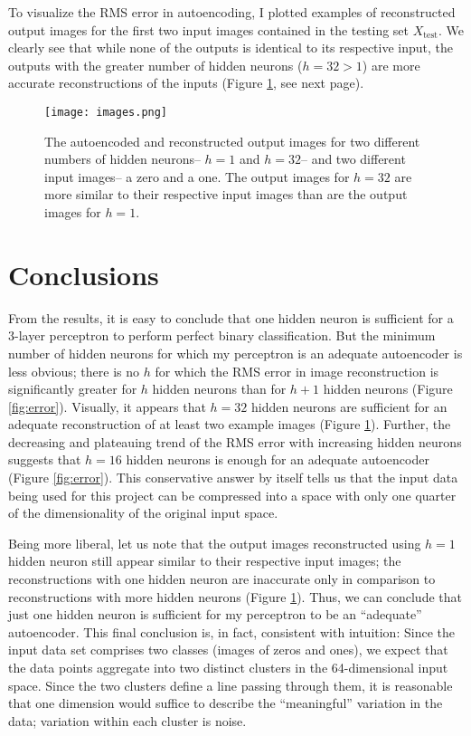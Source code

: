 \documentclass[12pt]{article}
\newcommand{\Xtest}{X_{\text{test}}}
\begin{document}
To visualize the RMS error in autoencoding, I plotted examples of reconstructed output images for the first two input images contained in the testing set $\Xtest$. We clearly see that while none of the outputs is identical to its respective input, the outputs with the greater number of hidden neurons ($h=32>1$) are more accurate reconstructions of the inputs (Figure \ref{fig:images}, see next page).

\begin{figure}[h]
\centering
\texttt{[image: images.png]}
\caption{\label{fig:images} The autoencoded and reconstructed output images for two different numbers of hidden neurons-- $h = 1$ and $h=32$-- and two different input images-- a zero and a one. The output images for $h=32$ are more similar to their respective input images than are the output images for $h=1$.}
\end{figure}

\section{Conclusions}

From the results, it is easy to conclude that one hidden neuron is sufficient for a 3-layer perceptron to perform perfect binary classification. But the minimum number of hidden neurons for which my perceptron is an adequate autoencoder is less obvious; there is no $h$ for which the RMS error in image reconstruction is significantly greater for $h$ hidden neurons than for $h+1$ hidden neurons (Figure \ref{fig:error}). Visually, it appears that $h=32$ hidden neurons are sufficient for an adequate reconstruction of at least two example images (Figure \ref{fig:images}). Further, the decreasing and plateauing trend of the RMS error with increasing hidden neurons suggests that $h=16$ hidden neurons is enough for an adequate autoencoder (Figure \ref{fig:error}). This conservative answer by itself tells us that the input data being used for this project can be compressed into a space with only one quarter of the dimensionality of the original input space.

Being more liberal, let us note that the output images reconstructed using $h=1$ hidden neuron still appear similar to their respective input images; the reconstructions with one hidden neuron are inaccurate only in comparison to reconstructions with more hidden neurons (Figure \ref{fig:images}). Thus, we can conclude that just one hidden neuron is sufficient for my perceptron to be an ``adequate'' autoencoder. This final conclusion is, in fact, consistent with intuition: Since the input data set comprises two classes (images of zeros and ones), we expect that the data points aggregate into two distinct clusters in the 64-dimensional input space. Since the two clusters define a line passing through them, it is reasonable that one dimension would suffice to describe the ``meaningful'' variation in the data; variation within each cluster is noise.
\end{document}
